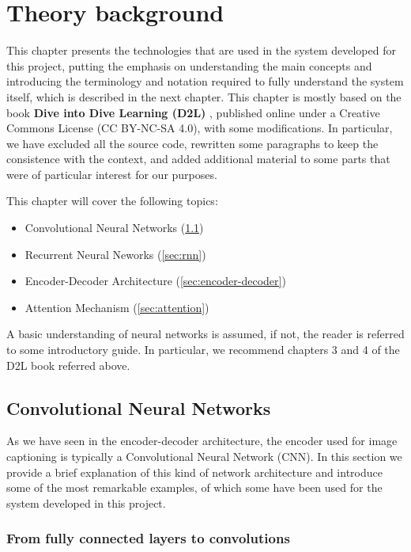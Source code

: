 \chapter{Theory background}
\label{ch:theory}

This chapter presents the technologies that are used in the system developed for this project, putting the emphasis on understanding the main concepts and introducing the terminology and notation required to fully understand the system itself, which is described in the next chapter. This chapter is mostly based on the book \textbf{Dive into Dive Learning (D2L)} \citep{Zhang2019d2l}, published online under a Creative Commons License (CC BY-NC-SA 4.0), with some modifications. In particular, we have excluded all the source code, rewritten some paragraphs to keep the consistence with the context, and added additional material to some parts that were of particular interest for our purposes.

This chapter will cover the following topics:

\begin{itemize}
    \item Convolutional Neural Networks (\cref{sec:cnn})
    \item Recurrent Neural Neworks (\cref{sec:rnn})
    \item Encoder-Decoder Architecture (\cref{sec:encoder-decoder})
    \item Attention Mechanism (\cref{sec:attention})
\end{itemize}

A basic understanding of neural networks is assumed, if not, the reader is referred to some introductory guide. In particular, we recommend chapters 3 and 4 of the D2L book referred above.

\section{Convolutional Neural Networks}\label{sec:cnn}

As we have seen in the encoder-decoder architecture, the encoder used for image captioning is typically a Convolutional Neural Network (CNN). In this section we provide a brief explanation of this kind of network architecture and introduce some of the most remarkable examples, of which some have been used for the system developed in this project.

\subsection{From fully connected layers to convolutions}

